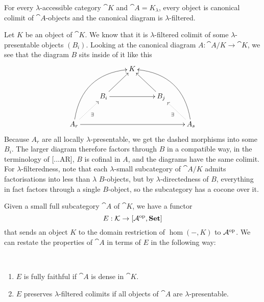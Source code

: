 \begin{Proposition}\label{prop:presdense}
For every $\lambda$-accessible category $\cat K$ and $\cat A = K_\lambda$, every object is canonical colimit of $\cat A$-objects and the canonical diagram is $\lambda$-filtered.
\end{Proposition}
\begin{Proof}
Let $K$ be an object of $\cat K$. We know that it is $\lambda$-filtered colimit of some $\lambda$-presentable objects $(B_i)$. Looking at the canonical diagram $A : \cat A/K \to \cat K$, we see that the diagram $B$ sits inside of it like this
\[
\xymatrix{
  & & K & & \\
& B_i \ar[rr] \ar[ru] & & B_j \ar[lu] & \\
A_r \ar[rrrr] \ar@/^2pc/[rruu] \ar@{.>}[ru]_{\exists} & & & & A_s \ar@{.>}[lu]^{\exists} \ar@/_2pc/[lluu]
}\]
Because $A_r$ are all locally $\lambda$-presentable, we get the dashed morphisms into some $B_i$. The larger diagram therefore factors through $B$ in a compatible way, in the terminology of [...AR], $B$ is cofinal in $A$, and the diagrams have the same colimit. \\

For $\lambda$-filteredness, note that each $\lambda$-small subcategory of $\cat A/K$ admits factorisations into less than $\lambda$ $B$-objects, but by $\lambda$-directedness of $B$, everything in fact factors through a single $B$-object, so the subcategory has a cocone over it. 
\end{Proof}


Given a small full subcategory $\cat A$ of $\cat K$, we have a functor 
\[ E : \mathcal{K} \to [\mathcal{A}^{\textrm{op}},\mathbf{Set}] \]
that sends an object $K$ to the domain restriction of $\hom(-, K)$ to $\mathcal{A}^{\textrm{op}}$. We can restate the properties of $\cat A$ in terms of $E$ in the following way:

\begin{Proposition}\
\label{prop:canonicalproperties}
\begin{enumerate}
\item $E$ is fully faithful if $\cat A$ is dense in $\cat K$. \label{item:fullyfaithful}
\item $E$ preserves $\lambda$-filtered colimits if all objects of $\cat A$ are $\lambda$-presentable. \label{item:limits}
\end{enumerate}
\end{Proposition}

